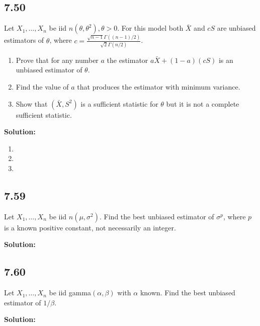 \documentclass[11pt]{article}
\newcommand{\Sol}{\par {\bf Solution:}}
\newcommand{\sample}[1]{#1_1 , \dots , #1_n}
\begin{document}
\subsection*{7.50}
Let $\sample X$ be iid $n(\theta, \theta^2), \theta > 0$. For this model both $\bar X$ and $cS$ are unbiased estimators of $\theta$, where $c = \frac{\sqrt{n-1}\Gamma((n-1)/2)}{\sqrt{2}\Gamma(n/2)}$.
\begin{enumerate}[label=(\alph*)]
    \item Prove that for any number $a$ the estimator $a \bar X + (1-a)(cS)$ is an unbiased estimator of $\theta$.
    \item Find the value of $a$ that produces the estimator with minimum variance.
    \item Show that $(\bar X, S^2)$ is a sufficient statistic for $\theta$ but it is not a complete sufficient statistic.
\end{enumerate}

\Sol
\begin{enumerate}[label=(\alph*)]
    \item
    \item
    \item
\end{enumerate}

\subsection*{7.59}
Let $\sample X$ be iid $n(\mu, \sigma^2)$. Find the best unbiased estimator of $\sigma^p$, where $p$ is a known positive constant, not necessarily an integer.

\Sol

\subsection*{7.60}
Let $\sample X$ be iid gamma$(\alpha, \beta)$ with $\alpha$ known. Find the best unbiased estimator of $1/\beta$.

\Sol
\end{document}
